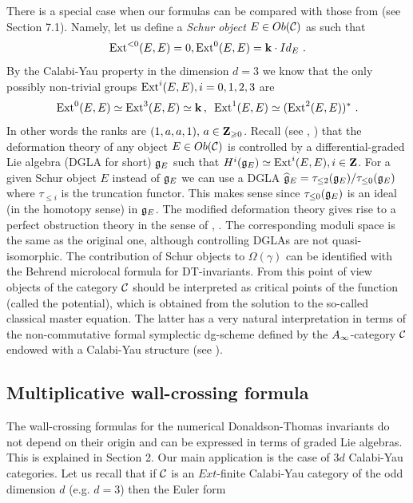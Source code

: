 \documentclass[12pt]{article}
\begin{document}
There is a special case when our formulas can be compared with those from \cite{B} (see Section 7.1). Namely, let us define a {\it Schur object} $E\in Ob({\mathcal C})$ as such that $$\operatorname{Ext}^{<0}(E,E)=0, \operatorname{Ext}^0(E,E)={\bf k}\cdot Id_E\,\,.$$
 By the Calabi-Yau property in the dimension $d=3$ we know that the only possibly non-trivial groups 
$\operatorname{Ext}^i(E,E), i=0,1,2,3$ are $$\operatorname{Ext}^0(E,E)\simeq \operatorname{Ext}^3(E,E)\simeq {\bf k}\,,\,\,\,\operatorname{Ext}^1(E,E)\simeq (\operatorname{Ext}^2(E,E))^{\ast}\,\,.$$
 In other words the ranks are $(1,a,a,1),\, a\in {\bf Z}_{\geqslant 0}$. Recall (see \cite{KoSo2}, \cite{KoSo3}) that the deformation theory of any object $E\in Ob({\mathcal C})$ is controlled by a differential-graded Lie algebra (DGLA for short) ${\mathfrak g}_E$ such that $H^i({\mathfrak g}_E)\simeq \operatorname{Ext}^i(E,E), i\in {\bf Z}$. For a given Schur object $E$ instead of ${\mathfrak g}_E$ we can use a DGLA
$\widehat{{\mathfrak g}}_E=\tau_{\le 2}({\mathfrak g}_E)/\tau_{\le 0}({\mathfrak g}_E)$ where $\tau_{\le i}$ is the truncation functor. This makes sense since $\tau_{\le 0}({\mathfrak g}_E)$ is an ideal (in the homotopy sense) in ${\mathfrak g}_E$. The modified deformation theory gives rise to a perfect obstruction theory in the sense of \cite{B}, \cite{BF}. The corresponding moduli space is the same as the original one, although controlling DGLAs are not quasi-isomorphic. The contribution of Schur objects to $\Omega(\gamma)$ can be identified with the Behrend microlocal formula for DT-invariants.
From this point of view objects of the category ${\mathcal C}$ should be interpreted as critical points of the function (called the potential), which is obtained from the solution to the so-called classical master equation. The latter has a very natural interpretation in terms of the non-commutative formal symplectic dg-scheme defined by the $A_{\infty}$-category ${\mathcal C}$ endowed with a Calabi-Yau structure (see \cite{KoSo3}).











\subsection{Multiplicative wall-crossing formula}

The wall-crossing formulas for the numerical Donaldson-Thomas invariants do not depend on their origin and can be expressed in terms of graded Lie algebras. This is explained in Section 2. Our main application is the case of  $3d$ Calabi-Yau categories. Let us recall that
if ${\cal C}$ is an $Ext$-finite Calabi-Yau category of the odd dimension $d$ (e.g. $d=3$)
then the Euler form
\end{document}

